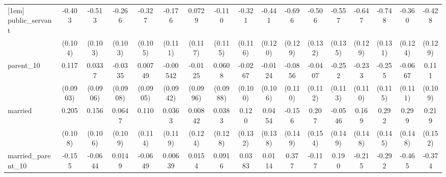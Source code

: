 {\begin{tabular}{l*{16}{c}}
[1em]
public\_servant      &      -0.403\sym{***}&      -0.513\sym{***}&      -0.266\sym{*}  &      -0.327\sym{**} &      -0.176         &      0.0729         &      -0.110         &      -0.321\sym{**} &      -0.441\sym{***}&      -0.696\sym{***}&      -0.506\sym{***}&      -0.557\sym{***}&      -0.647\sym{***}&      -0.748\sym{***}&      -0.360\sym{**} &      -0.428\sym{***}\\
                    &     (0.104)         &     (0.103)         &     (0.103)         &     (0.105)         &     (0.111)         &     (0.117)         &     (0.115)         &     (0.116)         &     (0.120)         &     (0.129)         &     (0.132)         &     (0.135)         &     (0.129)         &     (0.131)         &     (0.124)         &     (0.129)         \\
[1em]
parent\_10           &       0.117         &      0.0337         &     -0.0335         &     0.00749         &    -0.00542         &     -0.0125         &      0.0608         &     -0.0267         &     -0.0124         &     -0.0856         &     -0.0407         &      -0.252\sym{*}  &      -0.233\sym{*}  &      -0.255\sym{*}  &     -0.0667         &       0.111         \\
                    &    (0.0903)         &    (0.0906)         &    (0.0908)         &    (0.0905)         &    (0.0942)         &    (0.0996)         &    (0.0988)         &     (0.100)         &     (0.106)         &     (0.110)         &     (0.112)         &     (0.113)         &     (0.110)         &     (0.115)         &     (0.111)         &     (0.109)         \\
[1em]
married             &       0.205         &       0.156         &      0.0647         &       0.110         &      0.0363         &     0.00842         &      0.0383         &       0.120         &      0.0454         &      -0.156         &       0.207         &     -0.0546         &       0.169         &       0.292\sym{*}  &       0.299\sym{*}  &       0.219         \\
                    &     (0.108)         &     (0.106)         &     (0.109)         &     (0.114)         &     (0.119)         &     (0.124)         &     (0.128)         &     (0.132)         &     (0.138)         &     (0.149)         &     (0.154)         &     (0.149)         &     (0.148)         &     (0.145)         &     (0.148)         &     (0.152)         \\
[1em]
married\_parent\_10   &      -0.155         &     -0.0644         &      0.0149         &     -0.0649         &     0.00639         &      0.0154         &      0.0916         &      0.0383         &      0.0114         &       0.377\sym{*}  &      -0.117         &       0.190         &      -0.215         &      -0.292         &      -0.465\sym{*}  &      -0.374\sym{*}  \\

\end{tabular}}
